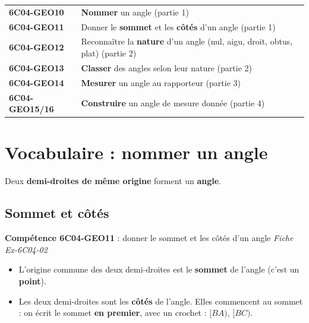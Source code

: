 \documentclass[11pt]{article}
\newcommand{\comp}[2]{\par\smallskip\noindent\colorbox{gray!15}{\parbox{\dimexpr\linewidth-2\fboxsep}{\small\textbf{Compétence #1} : #2}}\par\smallskip}
\begin{document}
\begin{tcolorbox}[colback=white,colframe=black,boxrule=0.6pt,arc=2mm,title={\textbf{Ce que je dois savoir faire à la fin du chapitre}},coltitle=black,colbacktitle=gray!15]
\begin{tabular}{@{}ll@{}}
\textbf{6C04-GEO10} & \textbf{Nommer} un angle \hfill (partie 1)\\
\textbf{6C04-GEO11} & Donner le \textbf{sommet} et les \textbf{côtés} d'un angle \hfill (partie 1)\\
\textbf{6C04-GEO12} & Reconnaître la \textbf{nature} d'un angle (nul, aigu, droit, obtus, plat) \hfill (partie 2)\\
\textbf{6C04-GEO13} & \textbf{Classer} des angles selon leur nature \hfill (partie 2)\\
\textbf{6C04-GEO14} & \textbf{Mesurer} un angle au rapporteur \hfill (partie 3)\\
\textbf{6C04-GEO15/16} & \textbf{Construire} un angle de mesure donnée \hfill (partie 4)\\
\end{tabular}
\end{tcolorbox}

\section{Vocabulaire : nommer un angle}

\begin{definition}
Deux \textbf{demi-droites de même origine} forment un \textbf{angle}.
\end{definition}

\subsection{Sommet et côtés}
\comp{6C04-GEO11}{donner le sommet et les côtés d'un angle \hfill \textit{Fiche Ex-6C04-02}}

\begin{vocabulaire}
\begin{itemize}
\item L'origine commune des deux demi-droites est le \textbf{sommet} de l'angle (c'est un \textbf{point}).
\item Les deux demi-droites sont les \textbf{côtés} de l'angle. Elles commencent au sommet :
on écrit le sommet \textbf{en premier}, avec un crochet : $[BA)$, $[BC)$.
\end{itemize}
\end{vocabulaire}
\end{document}
